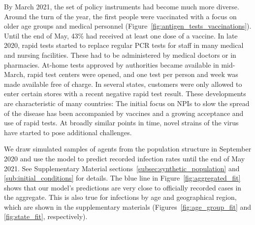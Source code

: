 \begin{figure}[!tp]
\end{figure}

By March 2021, the set of policy instruments had become much more diverse. Around the
turn of the year, the first people were vaccinated with a focus on older age groups and
medical personnel (Figure~\ref{fig:antigen_tests_vaccinations}). Until the end of May,
43\% had received at least one dose of a vaccine. In late 2020, rapid tests started to
replace regular PCR tests for staff in many medical and nursing facilities. These had to
be administered by medical doctors or in pharmacies. At-home tests approved by
authorities became available in mid-March, rapid test centers were opened, and one test
per person and week was made available free of charge. In several states, customers were
only allowed to enter certain stores with a recent negative rapid test result. These
developments are characteristic of many countries: The initial focus on NPIs to slow the
spread of the disease has been accompanied by vaccines and a growing acceptance and use
of rapid tests. At broadly similar points in time, novel strains of the virus have
started to pose additional challenges.

We draw simulated samples of agents from the population structure in September 2020 and
use the model to predict recorded infection rates until the end of May 2021. See
Supplementary Material sections~\ref{subsec:synthetic_population} and
\ref{sub:initial_conditions} for details. The blue line in
Figure~\ref{fig:aggregated_fit} shows that our model's predictions are very close to
officially recorded cases in the aggregate. This is also true for infections by age and
geographical region, which are shown in the supplementary materials
(Figures~\ref{fig:age_group_fit} and \ref{fig:state_fit}, respectively).


